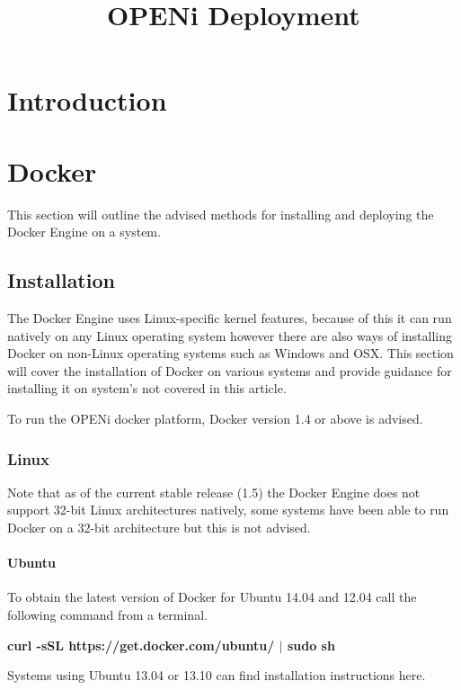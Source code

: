 \documentclass[10pt,a4paper]{article}
\title{OPENi Deployment}
\begin{document}
\maketitle

\section{Introduction}
 


\section{Docker}
This section will outline the advised methods for installing and deploying the Docker Engine on a system.

\subsection{Installation}
The Docker Engine uses Linux-specific kernel features, because of this it can run natively on any Linux operating system however there are also ways of installing Docker on non-Linux operating systems such as Windows and OSX. This section will cover the installation of Docker on various systems and provide guidance for installing it on system's not covered in this article.

To run the OPENi docker platform, Docker version 1.4 or above is advised. 

\subsubsection{Linux}
Note that as of the current stable release (1.5) the Docker Engine does not support 32-bit Linux architectures natively, some systems have been able to run Docker on a 32-bit architecture but this is not advised.

\newpage

\paragraph{Ubuntu}
To obtain the latest version of Docker for Ubuntu 14.04 and 12.04 call the following command from a terminal.

\centerline{\textbf{curl -sSL https://get.docker.com/ubuntu/ $\vert$ sudo sh}}

Systems using Ubuntu 13.04 or 13.10 can find installation instructions here.
 
\end{document}
